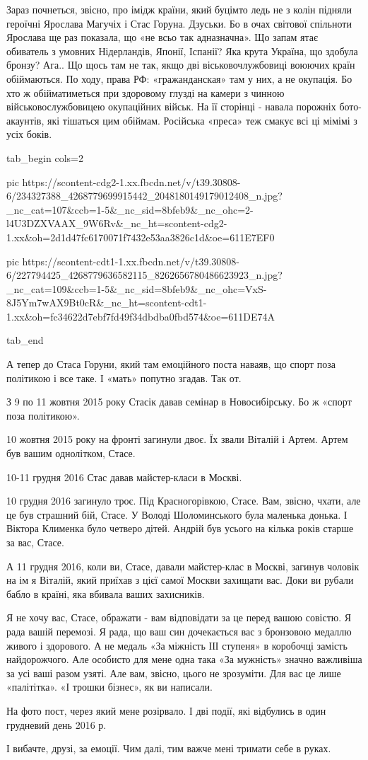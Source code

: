 Зараз почнеться, звісно, про імідж країни, який буцімто ледь не з колін підняли
героїчні Ярослава Магучіх і Стас Горуна. Дзуськи. Бо в очах світової спільноти
Ярослава ще раз показала, що «не всьо так адназначна». Що запам ятає обиватель
з умовних Нідерландів, Японії, Іспанії? Яка крута Україна, що здобула бронзу?
Ага.. Що щось там не так, якщо дві віськовочлужбовиці воюючих країн
обіймаються. По ходу, права РФ: «гражанданская» там у них, а не окупація. Бо
хто ж обійматиметься при здоровому глузді на камери з чинною
військовослужбовицею окупаційних військ. На її сторінці - навала порожніх
бото-акаунтів, які тішаться цим обіймам. Російська «преса» теж смакує всі ці
мімімі з усіх боків. 

\ifcmt
  tab_begin cols=2

     pic https://scontent-cdg2-1.xx.fbcdn.net/v/t39.30808-6/234327388_4268779699915442_2048180149179012408_n.jpg?_nc_cat=107&ccb=1-5&_nc_sid=8bfeb9&_nc_ohc=2-l4U3DZXVAAX_9W6Rv&_nc_ht=scontent-cdg2-1.xx&oh=2d1d47fc6170071f7432e53aa3826c1d&oe=611E7EF0

     pic https://scontent-cdt1-1.xx.fbcdn.net/v/t39.30808-6/227794425_4268779636582115_8262656780486623923_n.jpg?_nc_cat=109&ccb=1-5&_nc_sid=8bfeb9&_nc_ohc=VxS-8J5Ym7wAX9Bt0cR&_nc_ht=scontent-cdt1-1.xx&oh=fc34622d7ebf7fd49f34dbdba0fbd574&oe=611DE74A

  tab_end
\fi

А тепер до Стаса Горуни, який там емоційного поста наваяв, що спорт поза
політикою і все таке. І «мать» попутно згадав. Так от. 

З 9 по 11 жовтня 2015 року Стасік давав семінар в Новосибірську. Бо ж «спорт
поза політикою». 

10 жовтня 2015 року на фронті загинули двоє. Їх звали Віталій і Артем. Артем
був вашим однолітком, Стасе.

10-11 грудня 2016 Стас давав майстер-класи в Москві. 

10 грудня 2016 загинуло троє. Під Красногорівкою, Стасе. Вам, звісно, чхати,
але це був страшний бій, Стасе. У Володі Шоломинського була маленька донька. І
Віктора Клименка було четверо дітей. Андрій був усього на кілька років старше
за вас, Стасе. 

А 11 грудня 2016, коли ви, Стасе, давали майстер-клас в Москві, загинув чоловік
на ім я Віталій, який приїхав з цієї самої Москви захищати вас. Доки ви рубали
бабло в країні, яка вбивала ваших захисників. 

Я не хочу вас, Стасе, ображати - вам відповідати за це перед вашою совістю. Я
рада вашій перемозі. Я рада, що ваш син дочекається вас з бронзовою медаллю
живого і здорового. А не медаль «За міжність ІІІ ступеня» в коробочці замість
найдорожчого. Але особисто для мене одна така «За мужність» значно важливіша за
усі ваші разом узяті. Але вам, звісно, цього не зрозуміти. Для вас це лише
«палітітка». «І трошки бізнес», як ви написали. 

На фото пост, через який мене розірвало. І дві події, які відбулись в один
грудневий день 2016 р. 

І вибачте, друзі, за емоції. Чим далі, тим важче мені тримати себе в руках.
